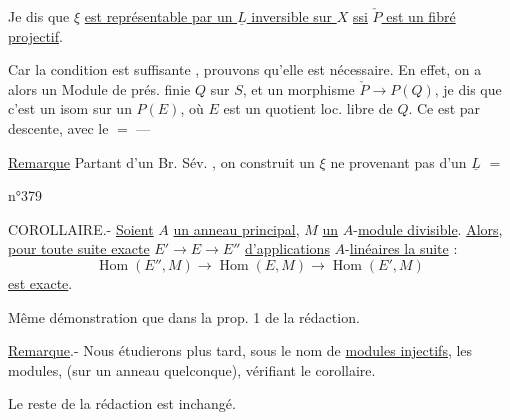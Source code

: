Je dis que $\xi$ \uline{est représentable par un $\underline L$ inversible sur $X$} \uline{ssi} \uline{$\check P$ est un fibré projectif}.
\margin{[$f:X\to S$ propre, $f_*(O_X)=O_S$ \unsure{univ\textsuperscript{t}}]}

Car la condition est suffisante , prouvons qu'elle est nécessaire.  En effet, on a alors un Module de prés. finie $Q$ sur $S$, et un morphisme $\check P\longrightarrow P(Q)$, je dis que c'est un isom sur un $P(E)$, où $E$ est un quotient loc. libre de $Q$. Ce est par descente, avec le $=$  ---



\uline{Remarque} Partant d'un Br. Sév. , on construit un $\xi$ ne provenant pas d'un $\underline L$  $=$ 

\hfill n°379

COROLLAIRE.- \uline{Soient} $A$ \uline{un anneau principal}, $M$ \uline{un} $A$-\uline{module divisible}. \uline{Alors}, \uline{pour toute suite exacte} $E'\longrightarrow E\longrightarrow E''$ \uline{d'applications} $A$-\uline{linéaires la suite} :
\[
\operatorname{Hom}(E'',M)\longrightarrow\operatorname{Hom}(E,M)\longrightarrow\operatorname{Hom}(E',M)
\]
\uline{est exacte}.

Même démonstration que dans la prop. 1 de la rédaction.

\uline{Remarque}.- Nous étudierons plus tard, sous le nom de \uline{modules injectifs}, les modules, (sur un anneau quelconque), vérifiant le corollaire.

Le reste de la rédaction est inchangé.

\begin{center}\unsure{-:-:-:-}\end{center}
